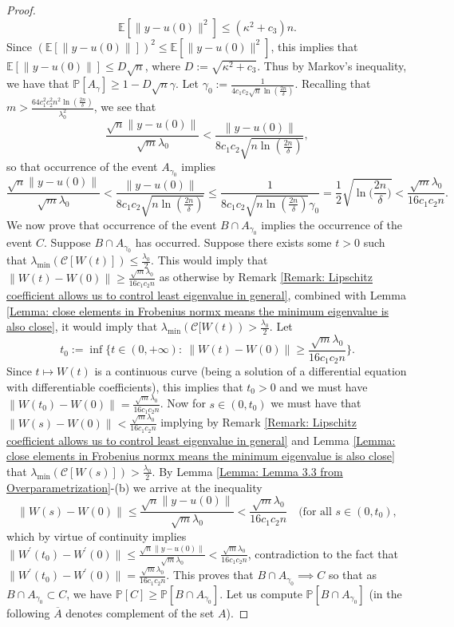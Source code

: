 \documentclass[a4paper,11pt]{amsart}
\newcommand{\IE}{\mathbb{E}}
\newcommand{\IP}{\mathbb{P}}
\theoremstyle{definition}
\theoremstyle{plain}
\theoremstyle{remark}
\begin{document}
\begin{proof}
\[
\IE[\|y-u(0)\|^2]\leq (\kappa^2+c_3)n.\]
Since $(\IE[\|y-u(0)\|])^2\leq\IE[\|y-u(0)\|^2]$, this implies that $\IE[\|y-u(0)\|]\leq D\sqrt{n}$, where $D:=\sqrt{\kappa^2+c_3}$. Thus by Markov's inequality, we have that $\IP[A_\gamma]\geq1-D\sqrt{n}\gamma$. Let $\gamma_0:=\frac{1}{4c_1c_2\sqrt{n}\ln(\frac{2n}{\delta})}$. Recalling that $m>\frac{64c_1^2c_2^2 n^2\ln(\frac{2n}{\delta})}{\lambda_0^2}$, we see that 
\[
\frac{\sqrt{n}\|y-u(0)\|}{\sqrt{m}\lambda_0}<\frac{\|y-u(0)\|}{8c_1c_2\sqrt{n\ln(\frac{2n}{\delta})}}, 
\]
so that occurrence of the event $A_{\gamma_0}$ implies \[\frac{\sqrt{n}\|y-u(0)\|}{\sqrt{m}\lambda_0}<\frac{\|y-u(0)\|}{8c_1c_2\sqrt{n\ln(\frac{2n}{\delta})}}\leq\frac{1}{8c_1c_2\sqrt{n\ln(\frac{2n}{\delta})}\gamma_0}=\frac{1}{2}\sqrt{\ln\Big(\frac{2n}{\delta}\Big)}<\frac{\sqrt{m}\lambda_0}{16c_1c_2n}.\]
We now prove that occurrence of the event $B\cap A_{\gamma_0}$ implies the occurrence of the event $C$. Suppose $B\cap A_{\gamma_0}$ has occurred. Suppose there exists some $t>0$ such that $\lambda_{\min}(\mathcal{C}[W(t)])\leq\frac{\lambda_0}{2}$. This would imply that $\|W(t)-W(0)\|\geq\frac{\sqrt{m}\lambda_0}{16c_1c_2n}$ as otherwise by Remark \ref{Remark: Lipschitz coefficient allows us to control least eigenvalue in general}, combined with Lemma \ref{Lemma: close elements in Frobenius normx means the minimum eigenvalue is also close}, it would imply that $\lambda_{\min}(\mathcal{C}[W(t))>\frac{\lambda_0}{2}$. Let \[t_0:=\inf\{t\in(0,+\infty):~\|W(t)-W(0)\|\geq\frac{\sqrt{m}\lambda_0}{16c_1c_2n}\}.\] Since $t\mapsto W(t)$ is a continuous curve (being a solution of a differential equation with differentiable coefficients), this implies that $t_0>0$ and we must have $\|W(t_0)-W(0)\|=\frac{\sqrt{m}\lambda_0}{16c_1c_2n}$. Now for $s\in(0,t_0)$ we must have that $\|W(s)-W(0)\|<\frac{\sqrt{m}\lambda_0}{16c_1c_2n}$ implying by Remark \ref{Remark: Lipschitz coefficient allows us to control least eigenvalue in general} and Lemma \ref{Lemma: close elements in Frobenius normx means the minimum eigenvalue is also close} that $\lambda_{\min}(\mathcal{C}[W(s)])>\frac{\lambda_0}{2}$. By Lemma \ref{Lemma: Lemma 3.3 from Overparametrization}-(b) we arrive at the inequality \[\|W(s)-W(0)\|\leq\frac{\sqrt{n}\|y-u(0)\|}{\sqrt{m}\lambda_0}<\frac{\sqrt{m}\lambda_0}{16c_1c_2n}\quad(\text{for all $s\in(0,t_0)$},\] which by virtue of continuity implies $\|W^\prime(t_0)-W^\prime(0)\|\leq\frac{\sqrt{n}\|y-u(0)\|}{\sqrt{m}\lambda_0}<\frac{\sqrt{m}\lambda_0}{16c_1c_2n}$, contradiction to the fact that $\|W^\prime(t_0)-W^\prime(0)\|=\frac{\sqrt{m}\lambda_0}{16c_1c_2n}$. This proves that $B\cap A_{\gamma_0}\implies C$ so that as $B\cap A_{\gamma_0}\subset C$, we have $\IP[C]\geq\IP[B\cap A_{\gamma_0}]$. Let us compute $\IP[B\cap A_{\gamma_0}]$ (in the following $\overline{A}$ denotes complement of the set $A$).


\end{proof}
\end{document}
